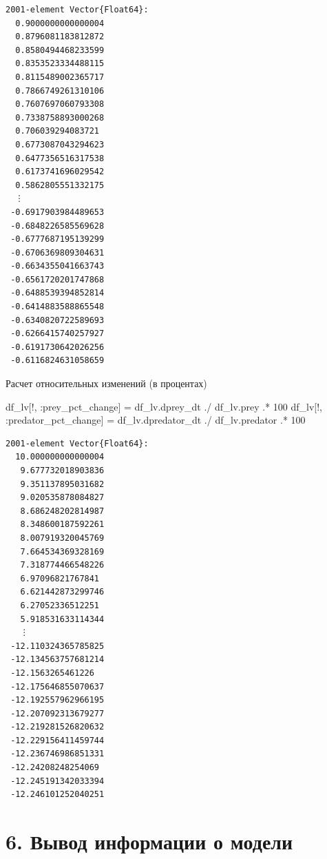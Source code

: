 \documentclass[
  12pt,
  a4paper,
  DIV=11,
  numbers=noendperiod]{scrreprt}
\newenvironment{Shaded}{\begin{snugshade}}{\end{snugshade}}
\newcommand{\FloatTok}[1]{\textcolor[rgb]{0.68,0.00,0.00}{#1}}
\newcommand{\NormalTok}[1]{\textcolor[rgb]{0.00,0.23,0.31}{#1}}
\newcommand{\OperatorTok}[1]{\textcolor[rgb]{0.37,0.37,0.37}{#1}}
\begin{document}
\begin{verbatim}
2001-element Vector{Float64}:
  0.9000000000000004
  0.8796081183812872
  0.8580494468233599
  0.8353523334488115
  0.8115489002365717
  0.7866749261310106
  0.7607697060793308
  0.7338758893000268
  0.706039294083721
  0.6773087043294623
  0.6477356516317538
  0.6173741696029542
  0.5862805551332175
  ⋮
 -0.6917903984489653
 -0.6848226585569628
 -0.6777687195139299
 -0.6706369809304631
 -0.6634355041663743
 -0.6561720201747868
 -0.6488539394852814
 -0.6414883588865548
 -0.6340820722589693
 -0.6266415740257927
 -0.6191730642026256
 -0.6116824631058659
\end{verbatim}

Расчет относительных изменений (в процентах)

\begin{Shaded}
\begin{Highlighting}[]
\NormalTok{df\_lv[!, }\OperatorTok{:}\NormalTok{prey\_pct\_change] }\OperatorTok{=}\NormalTok{ df\_lv.dprey\_dt }\OperatorTok{./}\NormalTok{ df\_lv.prey }\OperatorTok{.*} \FloatTok{100}
\NormalTok{df\_lv[!, }\OperatorTok{:}\NormalTok{predator\_pct\_change] }\OperatorTok{=}\NormalTok{ df\_lv.dpredator\_dt }\OperatorTok{./}\NormalTok{ df\_lv.predator }\OperatorTok{.*} \FloatTok{100}
\end{Highlighting}
\end{Shaded}

\begin{verbatim}
2001-element Vector{Float64}:
  10.000000000000004
   9.677732018903836
   9.351137895031682
   9.020535878084827
   8.686248202814987
   8.348600187592261
   8.007919320045769
   7.664534369328169
   7.318774466548226
   6.97096821767841
   6.621442873299746
   6.27052336512251
   5.918531633114344
   ⋮
 -12.110324365785825
 -12.134563757681214
 -12.1563265461226
 -12.175646855070637
 -12.192557962966195
 -12.207092313679277
 -12.219281526820632
 -12.229156411459744
 -12.236746986851331
 -12.24208248254069
 -12.245191342033394
 -12.246101252040251
\end{verbatim}

\section{6. Вывод информации о
модели}\label{ux432ux44bux432ux43eux434-ux438ux43dux444ux43eux440ux43cux430ux446ux438ux438-ux43e-ux43cux43eux434ux435ux43bux438}
\end{document}
